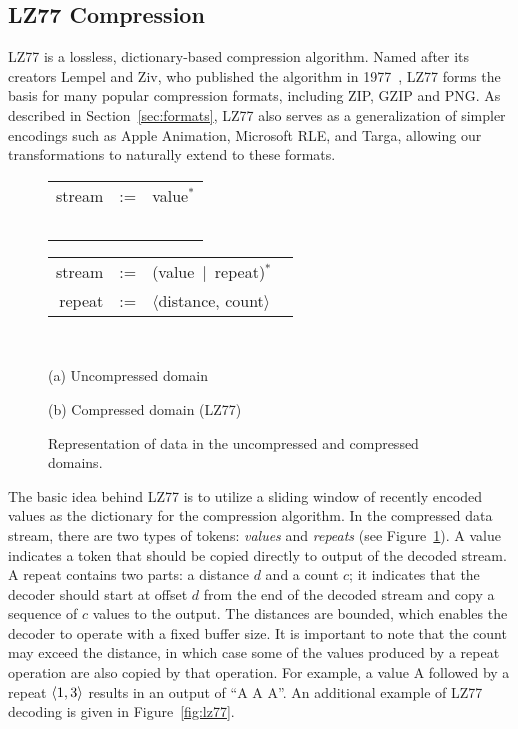 \subsection{LZ77 Compression}

LZ77 is a lossless, dictionary-based compression algorithm.  Named
after its creators Lempel and Ziv, who published the algorithm in
1977~\cite{lz77}, LZ77 forms the basis for many popular compression
formats, including ZIP, GZIP and PNG.  As described in
Section~\ref{sec:formats}, LZ77 also serves as a generalization of
simpler encodings such as Apple Animation, Microsoft RLE, and Targa,
allowing our transformations to naturally extend to these formats.

\begin{figure}[t]
\begin{minipage}{1.6in}
\hspace{-5pt}\begin{tabular}{rcl}
stream&\hspace{-9pt}:=&\hspace{-9pt}value$^*$\\ ~ & ~
\end{tabular}
\end{minipage}
\begin{minipage}{1.8in}
\hspace{-5pt}\begin{tabular}{rcl}
stream&\hspace{-9pt}:=&\hspace{-9pt}(value~$|$~repeat)$^*$ ~ \\
repeat&\hspace{-9pt}:=&\hspace{-9pt}$\langle$distance, count$\rangle$
\end{tabular}
\end{minipage} 
~ \\
\begin{minipage}{1.6in}
(a) Uncompressed domain
\end{minipage}
(b) Compressed domain (LZ77)
\caption{Representation of data in the uncompressed and compressed
domains.  \protect\label{fig:domains}}
\end{figure}

The basic idea behind LZ77 is to utilize a sliding window of recently
encoded values as the dictionary for the compression algorithm.  In
the compressed data stream, there are two types of tokens: {\it
values} and {\it repeats} (see Figure~\ref{fig:domains}).  A value
indicates a token that should be copied directly to output of the
decoded stream.  A repeat contains two parts: a distance $d$ and a
count $c$; it indicates that the decoder should start at offset $d$
from the end of the decoded stream and copy a sequence of $c$ values
to the output.  The distances are bounded, which enables the decoder
to operate with a fixed buffer size.  It is important to note that the
count may exceed the distance, in which case some of the values
produced by a repeat operation are also copied by that operation.  For
example, a value A followed by a repeat $\langle1, 3\rangle$ results in an
output of ``A A A''.  An additional example of LZ77 decoding is given
in Figure~\ref{fig:lz77}.

